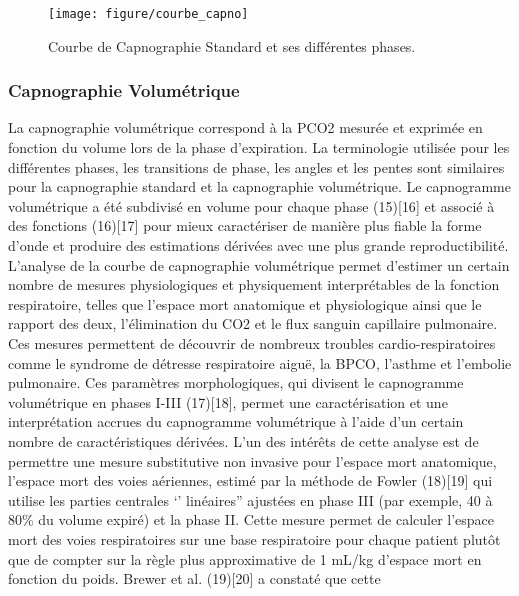\documentclass[12pt,]{article}
\begin{document}
\begin{figure}[h!]

{\centering \texttt{[image: figure/courbe\_capno]} 

}

\caption{Courbe de Capnographie Standard et ses différentes phases.}\label{fig:unnamed-chunk-2}
\end{figure}

\subsubsection{Capnographie
Volumétrique}\label{capnographie-volumetrique}

La capnographie volumétrique correspond à la PCO2 mesurée et exprimée en
fonction du volume lors de la phase d'expiration. La terminologie
utilisée pour les différentes phases, les transitions de phase, les
angles et les pentes sont similaires pour la capnographie standard et la
capnographie volumétrique. Le capnogramme volumétrique a été subdivisé
en volume pour chaque phase (15){[}16{]} et associé à des fonctions
(16){[}17{]} pour mieux caractériser de manière plus fiable la forme
d'onde et produire des estimations dérivées avec une plus grande
reproductibilité. L'analyse de la courbe de capnographie volumétrique
permet d'estimer un certain nombre de mesures physiologiques et
physiquement interprétables de la fonction respiratoire, telles que
l'espace mort anatomique et physiologique ainsi que le rapport des deux,
l'élimination du CO2 et le flux sanguin capillaire pulmonaire. Ces
mesures permettent de découvrir de nombreux troubles
cardio-respiratoires comme le syndrome de détresse respiratoire aiguë,
la BPCO, l'asthme et l'embolie pulmonaire. Ces paramètres
morphologiques, qui divisent le capnogramme volumétrique en phases I-III
(17){[}18{]}, permet une caractérisation et une interprétation accrues
du capnogramme volumétrique à l'aide d'un certain nombre de
caractéristiques dérivées. L'un des intérêts de cette analyse est de
permettre une mesure substitutive non invasive pour l'espace mort
anatomique, l'espace mort des voies aériennes, estimé par la méthode de
Fowler (18){[}19{]} qui utilise les parties centrales `' linéaires''
ajustées en phase III (par exemple, 40 à 80\% du volume expiré) et la
phase II. Cette mesure permet de calculer l'espace mort des voies
respiratoires sur une base respiratoire pour chaque patient plutôt que
de compter sur la règle plus approximative de 1 mL/kg d'espace mort en
fonction du poids. Brewer et al. (19){[}20{]} a constaté que cette
\end{document}
